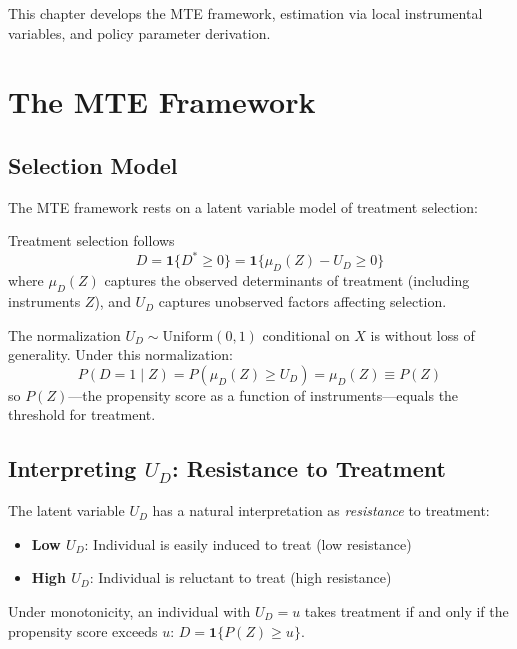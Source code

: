 This chapter develops the MTE framework, estimation via local instrumental variables, and policy parameter derivation.

\section{The MTE Framework}
\label{sec:mte-framework}

\subsection{Selection Model}

The MTE framework rests on a latent variable model of treatment selection:

\begin{definition}
\label{def:selection-equation}
Treatment selection follows
\begin{equation}
D = \mathbf{1}\{D^* \geq 0\} = \mathbf{1}\{\mu_D(Z) - U_D \geq 0\}
\end{equation}
where $\mu_D(Z)$ captures the observed determinants of treatment (including instruments $Z$), and $U_D$ captures unobserved factors affecting selection.
\end{definition}

The normalization $U_D \sim \text{Uniform}(0,1)$ conditional on $X$ is without loss of generality. Under this normalization:
\begin{equation}
P(D = 1 \mid Z) = P(\mu_D(Z) \geq U_D) = \mu_D(Z) \equiv P(Z)
\end{equation}
so $P(Z)$---the propensity score as a function of instruments---equals the threshold for treatment.

\subsection{Interpreting $U_D$: Resistance to Treatment}

The latent variable $U_D$ has a natural interpretation as \emph{resistance} to treatment:

\begin{itemize}
\item \textbf{Low $U_D$}: Individual is easily induced to treat (low resistance)
\item \textbf{High $U_D$}: Individual is reluctant to treat (high resistance)
\end{itemize}

Under monotonicity, an individual with $U_D = u$ takes treatment if and only if the propensity score exceeds $u$: $D = \mathbf{1}\{P(Z) \geq u\}$.


